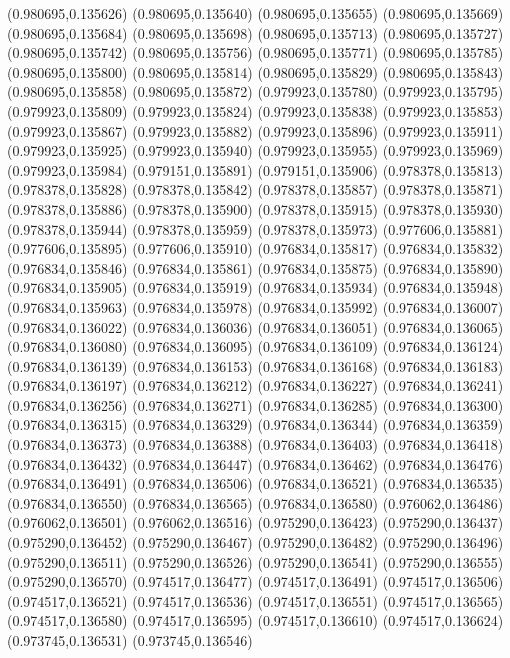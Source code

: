 (0.980695,0.135626)
(0.980695,0.135640)
(0.980695,0.135655)
(0.980695,0.135669)
(0.980695,0.135684)
(0.980695,0.135698)
(0.980695,0.135713)
(0.980695,0.135727)
(0.980695,0.135742)
(0.980695,0.135756)
(0.980695,0.135771)
(0.980695,0.135785)
(0.980695,0.135800)
(0.980695,0.135814)
(0.980695,0.135829)
(0.980695,0.135843)
(0.980695,0.135858)
(0.980695,0.135872)
(0.979923,0.135780)
(0.979923,0.135795)
(0.979923,0.135809)
(0.979923,0.135824)
(0.979923,0.135838)
(0.979923,0.135853)
(0.979923,0.135867)
(0.979923,0.135882)
(0.979923,0.135896)
(0.979923,0.135911)
(0.979923,0.135925)
(0.979923,0.135940)
(0.979923,0.135955)
(0.979923,0.135969)
(0.979923,0.135984)
(0.979151,0.135891)
(0.979151,0.135906)
(0.978378,0.135813)
(0.978378,0.135828)
(0.978378,0.135842)
(0.978378,0.135857)
(0.978378,0.135871)
(0.978378,0.135886)
(0.978378,0.135900)
(0.978378,0.135915)
(0.978378,0.135930)
(0.978378,0.135944)
(0.978378,0.135959)
(0.978378,0.135973)
(0.977606,0.135881)
(0.977606,0.135895)
(0.977606,0.135910)
(0.976834,0.135817)
(0.976834,0.135832)
(0.976834,0.135846)
(0.976834,0.135861)
(0.976834,0.135875)
(0.976834,0.135890)
(0.976834,0.135905)
(0.976834,0.135919)
(0.976834,0.135934)
(0.976834,0.135948)
(0.976834,0.135963)
(0.976834,0.135978)
(0.976834,0.135992)
(0.976834,0.136007)
(0.976834,0.136022)
(0.976834,0.136036)
(0.976834,0.136051)
(0.976834,0.136065)
(0.976834,0.136080)
(0.976834,0.136095)
(0.976834,0.136109)
(0.976834,0.136124)
(0.976834,0.136139)
(0.976834,0.136153)
(0.976834,0.136168)
(0.976834,0.136183)
(0.976834,0.136197)
(0.976834,0.136212)
(0.976834,0.136227)
(0.976834,0.136241)
(0.976834,0.136256)
(0.976834,0.136271)
(0.976834,0.136285)
(0.976834,0.136300)
(0.976834,0.136315)
(0.976834,0.136329)
(0.976834,0.136344)
(0.976834,0.136359)
(0.976834,0.136373)
(0.976834,0.136388)
(0.976834,0.136403)
(0.976834,0.136418)
(0.976834,0.136432)
(0.976834,0.136447)
(0.976834,0.136462)
(0.976834,0.136476)
(0.976834,0.136491)
(0.976834,0.136506)
(0.976834,0.136521)
(0.976834,0.136535)
(0.976834,0.136550)
(0.976834,0.136565)
(0.976834,0.136580)
(0.976062,0.136486)
(0.976062,0.136501)
(0.976062,0.136516)
(0.975290,0.136423)
(0.975290,0.136437)
(0.975290,0.136452)
(0.975290,0.136467)
(0.975290,0.136482)
(0.975290,0.136496)
(0.975290,0.136511)
(0.975290,0.136526)
(0.975290,0.136541)
(0.975290,0.136555)
(0.975290,0.136570)
(0.974517,0.136477)
(0.974517,0.136491)
(0.974517,0.136506)
(0.974517,0.136521)
(0.974517,0.136536)
(0.974517,0.136551)
(0.974517,0.136565)
(0.974517,0.136580)
(0.974517,0.136595)
(0.974517,0.136610)
(0.974517,0.136624)
(0.973745,0.136531)
(0.973745,0.136546)
